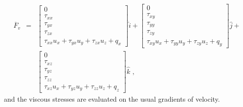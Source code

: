 \documentclass[12pt,a4paper,twoside]{article}
\begin{document}
\begin{eqnarray}
 \overline{F}_{v} & = & \left [ 
                            \begin{array}{c} 
                                0 \\
                                \tau_{xx} \\
                                \tau_{yx} \\
                                \tau_{zx} \\
                                \tau_{xx} u_{x} + \tau_{yx} u_{y} + \tau_{zx} u_{z} + q_{x}
                            \end{array}
                          \right ] \hat{i} 
                        + \left [ 
                             \begin{array}{c}
                                 0 \\
                                 \tau_{xy} \\
                                 \tau_{yy} \\
                                 \tau_{zy} \\
                                 \tau_{xy} u_{x} + \tau_{yy} u_{y} + \tau_{zy} u_{z} + q_{y}
                             \end{array}
                          \right ] \hat{j}  + \nonumber \\
                  &   &   \left [
                             \begin{array}{c}
                                 0 \\
                                 \tau_{xz} \\
                                 \tau_{yz} \\
                                 \tau_{zz} \\
                                 \tau_{xz} u_{x} + \tau_{yz} u_{y} + \tau_{zz} u_{z} + q_{z}
                             \end{array}
                          \right ] \hat{k} \text{ , }
 \label{eq:F_v_3D}
\end{eqnarray}
and the viscous stresses are evaluated on the usual gradients of velocity.
\end{document}
